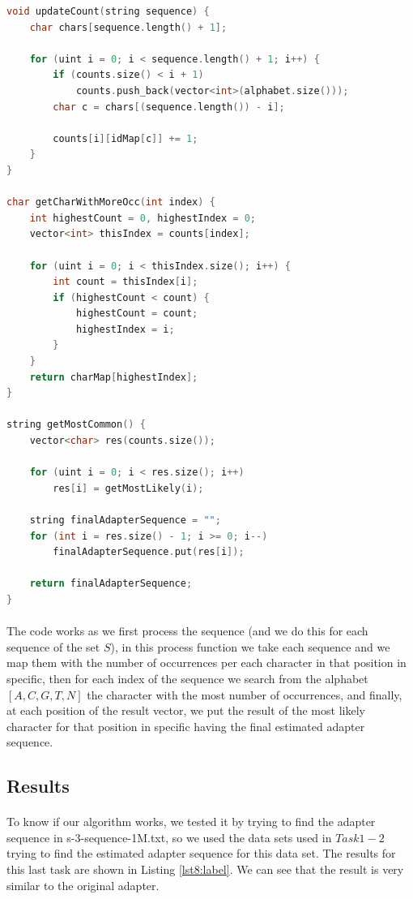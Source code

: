 \documentclass[a4paper,10pt]{article}
\begin{document}
\begin{lstlisting}[language=c++, caption=Algortihm that finds most used character in each position from a set $S$ of strings]
void updateCount(string sequence) {
    char chars[sequence.length() + 1];

    for (uint i = 0; i < sequence.length() + 1; i++) {
        if (counts.size() < i + 1) 
            counts.push_back(vector<int>(alphabet.size()));
        char c = chars[(sequence.length()) - i];

        counts[i][idMap[c]] += 1;
    }
}

char getCharWithMoreOcc(int index) {
    int highestCount = 0, highestIndex = 0;
    vector<int> thisIndex = counts[index];

    for (uint i = 0; i < thisIndex.size(); i++) {
        int count = thisIndex[i];
        if (highestCount < count) {
            highestCount = count;
            highestIndex = i;
        }
    }
    return charMap[highestIndex];
}

string getMostCommon() {
    vector<char> res(counts.size());

    for (uint i = 0; i < res.size(); i++)
        res[i] = getMostLikely(i);
    
    string finalAdapterSequence = "";
    for (int i = res.size() - 1; i >= 0; i--)
        finalAdapterSequence.put(res[i]);

    return finalAdapterSequence;
}
\end{lstlisting}

\paragraph{} The code works as we first process the sequence (and we do this for each sequence of the set $S$), in this process function we take each sequence and we map them with the number of occurrences per each character in that position in specific, then for each index of the sequence we search from the alphabet ${[A, C, G, T, N]}$ the character with the most number of occurrences, and finally, at each position of the result vector, we put the result of the most likely character for that position in specific having the final estimated adapter sequence.

\subsection{Results}

\paragraph{} To know if our algorithm works, we tested it by trying to find the adapter sequence in s-3-sequence-1M.txt, so we used the data sets used in $Task 1-2$ trying to find the estimated adapter sequence for this data set. The results for this last task are shown in Listing \ref{lst8:label}. We can see that the result is very similar to the original adapter.
\end{document}
